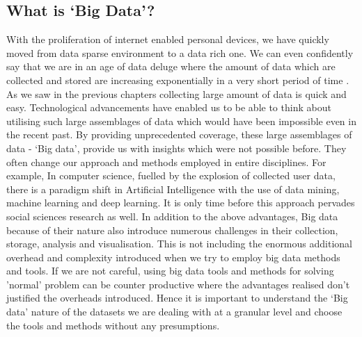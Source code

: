 
\subsection{What is `Big Data'?}

With the proliferation of internet enabled personal devices, we have quickly moved from data sparse environment to a data rich one.
We can even confidently say that we are in an age of data deluge where the amount of data which are collected and stored are increasing exponentially in a very short period of time \cite{kitchin2014}.
As we saw in the previous chapters collecting large amount of data is quick and easy.
Technological advancements have enabled us to be able to think about utilising such large assemblages of data which would have been impossible even in the recent past.
By providing unprecedented coverage, these large assemblages of data - `Big data', provide us with insights which were not possible before.
They often change our approach and methods employed in entire disciplines.
For example, In computer science, fuelled by the explosion of collected user data, there is a paradigm shift in Artificial Intelligence with the use of data mining, machine learning and deep learning.
It is only time before this approach pervades social sciences research as well.
In addition to the above advantages, Big data because of their nature also introduce numerous challenges in their collection, storage, analysis and visualisation.
This is not including the enormous additional overhead and complexity introduced when we try to employ big data methods and tools.
If we are not careful, using big data tools and methods for solving 'normal' problem can be counter productive where the advantages realised don't justified the overheads introduced.
Hence it is important to understand the `Big data' nature of the datasets we are dealing with at a granular level and choose the tools and methods without any presumptions.


